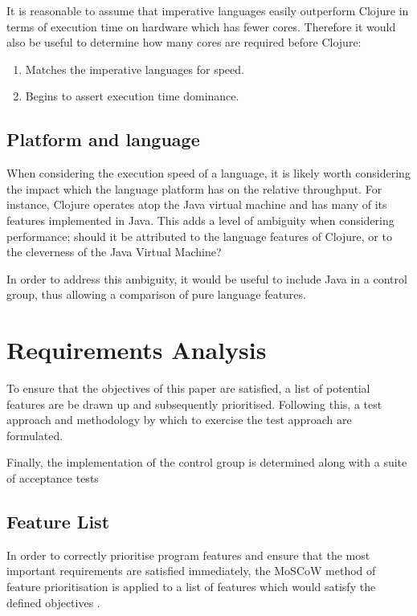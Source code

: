 \documentclass[12pt,a4paper]{article}
\begin{document}
It is reasonable to assume that imperative languages easily outperform Clojure in terms of execution time on hardware which has fewer cores. Therefore it would also be useful to determine how many cores are required before Clojure:

\begin{enumerate} \itemsep0pt
    \item Matches the imperative languages for speed.
    \item Begins to assert execution time dominance.
\end{enumerate}

\subsection{Platform and language}

When considering the execution speed of a language, it is likely worth considering the impact which the language platform has on the relative throughput. For instance, Clojure operates atop the Java virtual machine and has many of its features implemented in Java. This adds a level of ambiguity when considering performance; should it be attributed to the language features of Clojure, or to the cleverness of the Java Virtual Machine?

In order to address this ambiguity, it would be useful to include Java in a control group, thus allowing a comparison of pure language features.

\newpage
\section{Requirements Analysis}

To ensure that the objectives of this paper are satisfied, a list of potential features are be drawn up and subsequently prioritised. Following this, a test approach and methodology by which to exercise the test approach are formulated.

Finally, the implementation of the control group is determined along with a suite of acceptance tests

\subsection{Feature List}

In order to correctly prioritise program features and ensure that the most important requirements are satisfied immediately, the MoSCoW method of feature prioritisation is applied to a list of features which would satisfy the defined objectives \cite{moscow}.
\end{document}
